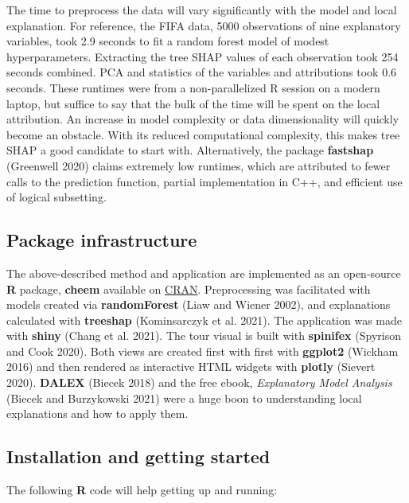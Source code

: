 \documentclass[
]{article}
\begin{document}
The time to preprocess the data will vary significantly with the model
and local explanation. For reference, the FIFA data, 5000 observations
of nine explanatory variables, took 2.9 seconds to fit a random forest
model of modest hyperparameters. Extracting the tree SHAP values of each
observation took 254 seconds combined. PCA and statistics of the
variables and attributions took 0.6 seconds. These runtimes were from a
non-parallelized R session on a modern laptop, but suffice to say that
the bulk of the time will be spent on the local attribution. An increase
in model complexity or data dimensionality will quickly become an
obstacle. With its reduced computational complexity, this makes tree
SHAP a good candidate to start with. Alternatively, the package
\textbf{fastshap} (Greenwell 2020) claims extremely low runtimes, which
are attributed to fewer calls to the prediction function, partial
implementation in C++, and efficient use of logical subsetting.

\hypertarget{sec:infrastructure}{%
\subsection{Package infrastructure}\label{sec:infrastructure}}

The above-described method and application are implemented as an
open-source \textbf{R} package, \textbf{cheem} available on
\href{https://CRAN.R-project.org/package=cheem}{CRAN}. Preprocessing was
facilitated with models created via \textbf{randomForest} (Liaw and
Wiener 2002), and explanations calculated with \textbf{treeshap}
(Kominsarczyk et al. 2021). The application was made with \textbf{shiny}
(Chang et al. 2021). The tour visual is built with \textbf{spinifex}
(Spyrison and Cook 2020). Both views are created first with first with
\textbf{ggplot2} (Wickham 2016) and then rendered as interactive HTML
widgets with \textbf{plotly} (Sievert 2020). \textbf{DALEX} (Biecek
2018) and the free ebook, \emph{Explanatory Model Analysis} (Biecek and
Burzykowski 2021) were a huge boon to understanding local explanations
and how to apply them.

\hypertarget{installation-and-getting-started}{%
\subsection{Installation and getting
started}\label{installation-and-getting-started}}

The following \textbf{R} code will help getting up and running:
\end{document}
